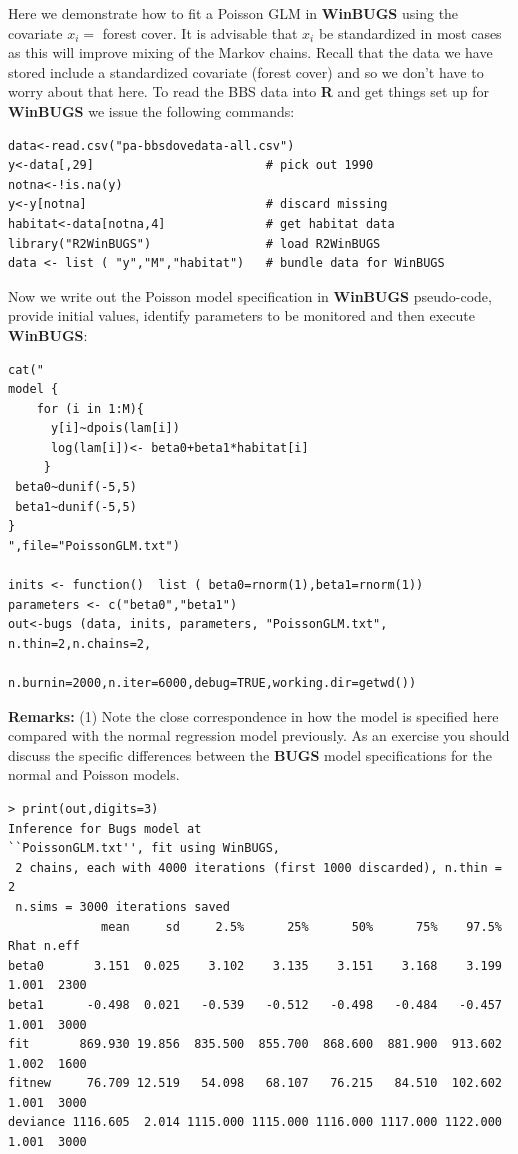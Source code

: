 Here we demonstrate how to fit a Poisson GLM in {\bf WinBUGS} using the
covariate $x_{i} =$ forest cover. It is advisable that $x_i$ be
standardized in most cases as this will improve mixing of the Markov
chains. Recall that the data we have stored include a standardized
covariate (forest cover) and so we don't have to worry about that
here.  To read the BBS data into {\bf R} and get things set up for
{\bf WinBUGS}
we issue the following commands:
{\small
\begin{verbatim}
data<-read.csv("pa-bbsdovedata-all.csv")
y<-data[,29]                        # pick out 1990
notna<-!is.na(y)
y<-y[notna]                         # discard missing
habitat<-data[notna,4]              # get habitat data
library("R2WinBUGS")                # load R2WinBUGS
data <- list ( "y","M","habitat")   # bundle data for WinBUGS
\end{verbatim}
}
Now we write out the Poisson model specification in {\bf WinBUGS}
pseudo-code, provide initial values, identify parameters to be
monitored and then execute {\bf WinBUGS}:
{\small
\begin{verbatim}
cat("
model {
    for (i in 1:M){
      y[i]~dpois(lam[i])
      log(lam[i])<- beta0+beta1*habitat[i]
     }
 beta0~dunif(-5,5)
 beta1~dunif(-5,5)
}
",file="PoissonGLM.txt")

inits <- function()  list ( beta0=rnorm(1),beta1=rnorm(1))
parameters <- c("beta0","beta1")
out<-bugs (data, inits, parameters, "PoissonGLM.txt", n.thin=2,n.chains=2,
                n.burnin=2000,n.iter=6000,debug=TRUE,working.dir=getwd())
\end{verbatim}
}
{\bf Remarks:} (1) Note the close correspondence in how the model is
specified here compared with the normal regression model
previously. As an exercise you should discuss the specific differences
between the {\bf BUGS} model specifications for the normal and Poisson
models.
{\small
\begin{verbatim}
> print(out,digits=3)
Inference for Bugs model at
``PoissonGLM.txt'', fit using WinBUGS,
 2 chains, each with 4000 iterations (first 1000 discarded), n.thin = 2
 n.sims = 3000 iterations saved
             mean     sd     2.5%      25%      50%      75%    97.5%  Rhat n.eff
beta0       3.151  0.025    3.102    3.135    3.151    3.168    3.199 1.001  2300
beta1      -0.498  0.021   -0.539   -0.512   -0.498   -0.484   -0.457 1.001  3000
fit       869.930 19.856  835.500  855.700  868.600  881.900  913.602 1.002  1600
fitnew     76.709 12.519   54.098   68.107   76.215   84.510  102.602 1.001  3000
deviance 1116.605  2.014 1115.000 1115.000 1116.000 1117.000 1122.000 1.001  3000
\end{verbatim}
}

